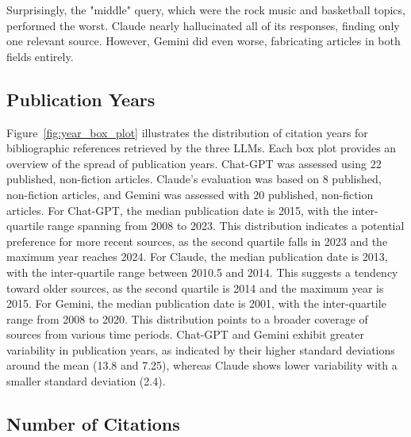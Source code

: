 \documentclass[runningheads]{llncs}
\begin{document}
Surprisingly, the "middle" query, which were the rock music and basketball topics, performed the worst. Claude nearly hallucinated all of its responses, finding only one relevant source. However, Gemini did even worse, fabricating articles in both fields entirely. 


\subsection{Publication Years}

Figure~\ref{fig:year_box_plot} illustrates the distribution of citation years for bibliographic references retrieved by the three LLMs. Each box plot provides an overview of the spread of publication years.
Chat-GPT was assessed using 22 published, non-fiction articles. Claude's evaluation was based on 8 published, non-fiction articles, and Gemini was assessed with 20 published, non-fiction articles.
For Chat-GPT, the median publication date is 2015, with the inter-quartile range spanning from 2008 to 2023. This distribution indicates a potential preference for more recent sources, as the second quartile falls in 2023 and the maximum year reaches 2024.
For Claude, the median publication date is 2013, with the inter-quartile range between 2010.5 and 2014. This suggests a tendency toward older sources, as the second quartile is 2014 and the maximum year is 2015.
For Gemini, the median publication date is 2001, with the inter-quartile range from 2008 to 2020. This distribution points to a broader coverage of sources from various time periods.
Chat-GPT and Gemini exhibit greater variability in publication years, as indicated by their higher standard deviations around the mean (13.8 and 7.25), whereas Claude shows lower variability with a smaller standard deviation (2.4).

\subsection{Number of Citations}
\end{document}
